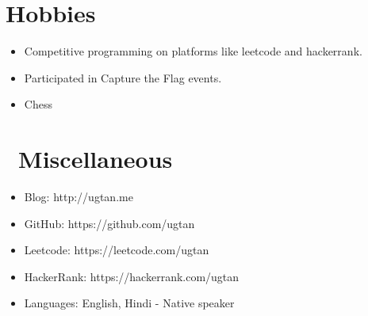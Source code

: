 \documentclass{resume}
\begin{document}
\section{Hobbies}
\begin{itemize}[parsep=0.5ex]
  \item Competitive programming on platforms like leetcode and hackerrank.
  \item Participated in Capture the Flag events.
  \item Chess
\end{itemize}

\section{\faInfo\ Miscellaneous}
\begin{itemize}[parsep=0.5ex]
  \item Blog: http://ugtan.me
  \item GitHub: https://github.com/ugtan
  \item Leetcode: https://leetcode.com/ugtan
  \item HackerRank: https://hackerrank.com/ugtan
  \item Languages: English, Hindi - Native speaker
\end{itemize}

%
%
\end{document}

